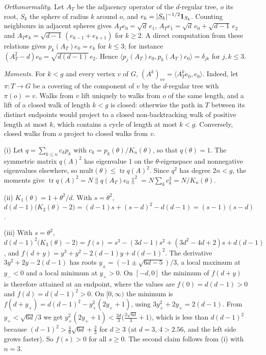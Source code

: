 \begin{informalproof}
\emph{Orthonormality.} Let $A_T$ be the adjacency operator of the $d$-regular tree, $o$ its root, $S_k$ the sphere of
radius $k$ around $o$, and $e_k=\lvert S_k \rvert^{-1/2}\mathbf 1_{S_k}$. Counting neighbours in adjacent spheres gives
$A_Te_0=\sqrt d\,e_1$, $A_Te_1=\sqrt d\,e_0+\sqrt{d-1}\,e_2$ and $A_Te_k=\sqrt{d-1}\,(e_{k-1}+e_{k+1})$ for $k\ge2$. A
direct computation from these relations gives $p_k(A_T)e_0=e_k$ for $k\le3$; for instance
$(A_T^2-d)e_0=\sqrt{d(d-1)}\,e_2$. Hence $\langle p_j(A_T)e_0,p_k(A_T)e_0\rangle=\delta_{jk}$ for $j,k\le3$.

\emph{Moments.} For $k<g$ and every vertex $v$ of $G$, $(A^k)_{vv}=\langle A_T^ke_0,e_0\rangle$. Indeed, let
$\pi\colon T\to G$ be a covering of the component of $v$ by the $d$-regular tree with $\pi(o)=v$. Walks from $v$ lift
uniquely to walks from $o$ of the same length, and a lift of a closed walk of length $k<g$ is closed: otherwise the path
in $T$ between its distinct endpoints would project to a closed non-backtracking walk of positive length at most $k$,
which contains a cycle of length at most $k<g$. Conversely, closed walks from $o$ project to closed walks from $v$.

(i) Let $q=\sum_{k\le n}c_kp_k$ with $c_k=p_k(\theta)/K_n(\theta)$, so that $q(\theta)=1$. The symmetric matrix $q(A)^2$
has eigenvalue $1$ on the $\theta$-eigenspace and nonnegative eigenvalues elsewhere, so
$\mathrm{mult}(\theta)\le\operatorname{tr}q(A)^2$. Since $q^2$ has degree $2n<g$, the moments give
$\operatorname{tr}q(A)^2=N\lVert q(A_T)e_0\rVert^2=N\sum_kc_k^2=N/K_n(\theta)$.

(ii) $K_1(\theta)=1+\theta^2/d$. With $s=\theta^2$, $d(d-1)\bigl(K_2(\theta)-2\bigr)=(d-1)s+(s-d)^2-d(d-1)=(s-1)(s-d)$.

(iii) With $s=\theta^2$, $d(d-1)^2\bigl(K_3(\theta)-2\bigr)=f(s)=s^3-(3d-1)s^2+(3d^2-4d+2)s+d(d-1)$, and
$f(d+y)=y^3+y^2-2(d-1)y+d(d-1)^2$. The derivative $3y^2+2y-2(d-1)$ has roots $y_\pm=(-1\pm\sqrt{6d-5})/3$, a local
maximum at $y_-<0$ and a local minimum at $y_+>0$. On $[-d,0]$ the minimum of $f(d+y)$ is therefore attained at an
endpoint, where the values are $f(0)=d(d-1)>0$ and $f(d)=d(d-1)^2>0$. On $[0,\infty)$ the minimum is
$f(d+y_+)=d(d-1)^2-y_+^2(2y_++1)$, using $3y_+^2+2y_+=2(d-1)$. From $y_+<\sqrt{6d}/3$ we get
$y_+^2(2y_++1)<\frac{2d}3\bigl(\frac{2\sqrt{6d}}3+1\bigr)$, which is less than $d(d-1)^2$ because
$(d-1)^2>\frac49\sqrt{6d}+\frac23$ for $d\ge3$ (at $d=3$, $4>2.56$, and the left side grows faster). So $f(s)>0$ for
all $s\ge0$. The second claim follows from (i) with $n=3$.


\end{informalproof}
